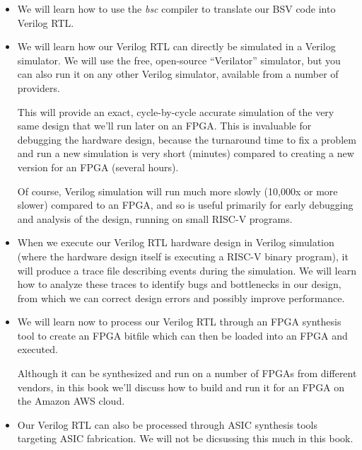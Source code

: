 \begin{itemize}
\item We will learn how to use the \emph{bsc} compiler to translate
    our BSV code into Verilog RTL.

\item We will learn how our Verilog RTL can directly be simulated in a
    Verilog simulator.  We will use the free, open-source
    ``Verilator'' simulator, but you can also run it on any other
    Verilog simulator, available from a number of providers.

    This will provide an exact, cycle-by-cycle accurate simulation of
    the very same design that we'll run later on an FPGA.  This is
    invaluable for debugging the hardware design, because the
    turnaround time to fix a problem and run a new simulation is very
    short (minutes) compared to creating a new version for an FPGA
    (several hours).

    Of course, Verilog simulation will run much more slowly (10,000x
    or more slower) compared to an FPGA, and so is useful primarily
    for early debugging and analysis of the design, running on small
    RISC-V programs.

\item When we execute our Verilog RTL hardware design in Verilog
    simulation (where the hardware design itself is executing a RISC-V
    binary program), it will produce a trace file describing events
    during the simulation.  We will learn how to analyze these traces
    to identify bugs and bottlenecks in our design, from which we can
    correct design errors and possibly improve performance.

\item We will learn now to process our Verilog RTL through an FPGA
    synthesis tool to create an FPGA bitfile which can then be loaded
    into an FPGA and executed.

    Although it can be synthesized and run on a number of FPGAs from
    different vendors, in this book we'll discuss how to build and run
    it for an FPGA on the Amazon AWS cloud.

\item Our Verilog RTL can also be processed through ASIC synthesis
    tools targeting ASIC fabrication.  We will not be dicsussing this
    much in this book.

\end{itemize}

